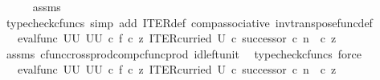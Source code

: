 \begin{isabellebody}
\ \ \ \ \isamarkupfalse%
\ assms\ \isamarkupfalse%
\ {\isacharparenleft}{\kern0pt}typecheck{\isacharunderscore}{\kern0pt}cfuncs{\isacharcomma}{\kern0pt}\ simp\ add{\isacharcolon}{\kern0pt}\ ITER{\isacharunderscore}{\kern0pt}def\ comp{\isacharunderscore}{\kern0pt}associative{}\ inv{\isacharunderscore}{\kern0pt}transpose{\isacharunderscore}{\kern0pt}func{\isacharunderscore}{\kern0pt}def{}{\isacharparenright}{\kern0pt}\isanewline
\ \ \isamarkupfalse%
\ \isamarkupfalse%
\ {\isachardoublequoteopen}{\isachardot}{\kern0pt}{\isachardot}{\kern0pt}{\isachardot}{\kern0pt}\ {\isacharequal}{\kern0pt}\ {\isacharparenleft}{\kern0pt}eval{\isacharunderscore}{\kern0pt}func\ {\isacharparenleft}{\kern0pt}U\isactrlbsup U\isactrlesup {\isacharparenright}{\kern0pt}\ {\isacharparenleft}{\kern0pt}U\isactrlbsup U\isactrlesup {\isacharparenright}{\kern0pt}{\isacharparenright}{\kern0pt}\ {\isasymcirc}\isactrlsub c\ {\isasymlangle}f\ {\isasymcirc}\isactrlsub c\ z{\isacharcomma}{\kern0pt}\ ITER{\isacharunderscore}{\kern0pt}curried\ U\ {\isasymcirc}\isactrlsub c\ {\isacharparenleft}{\kern0pt}successor\ {\isasymcirc}\isactrlsub c\ {\isacharparenleft}{\kern0pt}n\ \ {\isasymcirc}\isactrlsub c\ z{\isacharparenright}{\kern0pt}{\isacharparenright}{\kern0pt}{\isasymrangle}{\isachardoublequoteclose}\isanewline
\ \ \ \ \isamarkupfalse%
\ assms\ cfunc{\isacharunderscore}{\kern0pt}cross{\isacharunderscore}{\kern0pt}prod{\isacharunderscore}{\kern0pt}comp{\isacharunderscore}{\kern0pt}cfunc{\isacharunderscore}{\kern0pt}prod\ id{\isacharunderscore}{\kern0pt}left{\isacharunderscore}{\kern0pt}unit{}\ \isamarkupfalse%
\ {\isacharparenleft}{\kern0pt}typecheck{\isacharunderscore}{\kern0pt}cfuncs{\isacharcomma}{\kern0pt}\ force{\isacharparenright}{\kern0pt}\isanewline
\ \ \isamarkupfalse%
\ \isamarkupfalse%
\ {\isachardoublequoteopen}{\isachardot}{\kern0pt}{\isachardot}{\kern0pt}{\isachardot}{\kern0pt}\ {\isacharequal}{\kern0pt}\ {\isacharparenleft}{\kern0pt}eval{\isacharunderscore}{\kern0pt}func\ {\isacharparenleft}{\kern0pt}U\isactrlbsup U\isactrlesup {\isacharparenright}{\kern0pt}\ {\isacharparenleft}{\kern0pt}U\isactrlbsup U\isactrlesup {\isacharparenright}{\kern0pt}{\isacharparenright}{\kern0pt}\ {\isasymcirc}\isactrlsub c\ {\isasymlangle}f\ {\isasymcirc}\isactrlsub c\ z{\isacharcomma}{\kern0pt}\ {\isacharparenleft}{\kern0pt}ITER{\isacharunderscore}{\kern0pt}curried\ U\ {\isasymcirc}\isactrlsub c\ successor{\isacharparenright}{\kern0pt}\ {\isasymcirc}\isactrlsub c\ {\isacharparenleft}{\kern0pt}n\ \ {\isasymcirc}\isactrlsub c\ z{\isacharparenright}{\kern0pt}{\isasymrangle}{\isachardoublequoteclose}\isanewline

\end{isabellebody}
